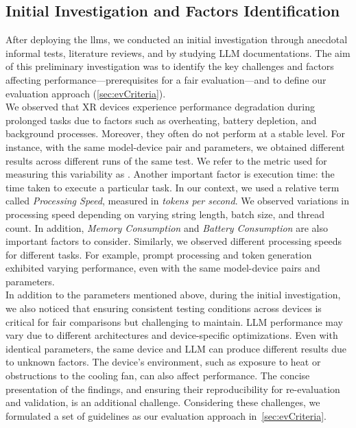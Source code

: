 \subsection{Initial Investigation and Factors Identification} 
\label{sec:InitInvestigation}
 After deploying the \glspl{llm}, 
 we conducted an initial investigation through anecdotal informal tests, literature reviews, and by studying LLM documentations. The aim of this preliminary investigation was to identify the key challenges and factors affecting performance---prerequisites for a fair evaluation---and to define our evaluation approach (\cref{sec:evCriteria}).\\
We observed that XR devices experience performance degradation during prolonged tasks due to factors such as overheating, battery depletion, and background processes. Moreover, they often do not perform at a stable level. For instance, with the same model-device pair and parameters, we obtained different results across different runs of the same test. We refer to the metric used for measuring this variability as \textit{}. Another important factor is execution time: the time taken to execute a particular task. In our context, we used a relative term called \textit{Processing Speed}, measured in \textit{tokens per second}. We observed variations in processing speed depending on varying  string length, batch size, and thread count. In addition, \textit{Memory Consumption} and \textit{Battery Consumption} are also important factors to consider. Similarly, we observed different processing speeds for different tasks. For example, prompt processing and token generation exhibited varying performance, even with the same model-device pairs and parameters.\\
In addition to the parameters mentioned above, during the initial investigation, we also noticed that ensuring consistent testing conditions across devices is critical for fair comparisons but challenging to maintain.   LLM performance may vary due to different architectures and device-specific optimizations. Even with identical parameters, the same device and LLM can produce different results due to unknown factors. The device's environment, such as exposure to heat or obstructions to the cooling fan, can also affect performance. The concise presentation of the findings, and ensuring their reproducibility for re-evaluation and validation, is an additional challenge. Considering these challenges, we formulated a set of guidelines as our evaluation approach in~\cref{sec:evCriteria}. 
